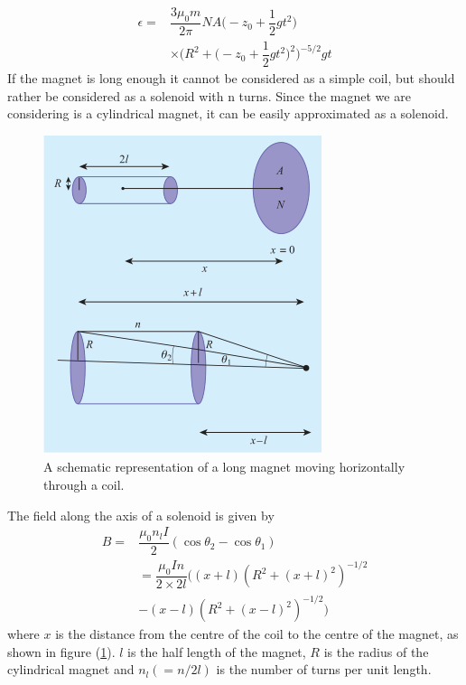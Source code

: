 \documentclass[%
 aip,
 amsmath,amssymb,
 reprint, floatfix%
]{revtex4-1}
\begin{document}
    \begin{equation}
        \begin{split}
            \epsilon = &\dfrac{3 \mu_0 m}{2 \pi} NA \Big( -z_0 + \dfrac{1}{2}gt^2 \Big) \\
            & \times \Bigg(R^2 + \Big( -z_0 + \dfrac{1}{2}gt^2 \Big)^2 \Bigg)^{-5/2} gt
        \end{split}
    \end{equation}
    If the magnet is long enough it cannot be considered as a simple coil, but should rather be considered as a solenoid with n turns. Since the magnet we are considering is a cylindrical magnet, it can be easily approximated as a solenoid.
    \begin{figure}
        \centering
        \includegraphics{Figures/longmagnet.png}
        \caption{A schematic representation of a long magnet moving horizontally through a coil.}
        \label{fig:longmagnet}
    \end{figure}
    The field along the axis of a solenoid is given by
    \begin{equation}
        \begin{split}
            B = &\dfrac{\mu_0 n_l I}{2} (\cos \theta_2 - \cos \theta_1) \\
            & =\dfrac{\mu_0 I n}{2 \times 2l} ((x+l) (R^2 + (x+l)^2)^{-1/2} \\
            & -(x-l)(R^2 + (x-l)^2)^{-1/2})
        \end{split}
    \end{equation}
    where $x$ is the distance from the centre of the coil to the centre of the magnet, as shown in figure (\ref{fig:longmagnet}). $l$ is the half length of the magnet, $R$ is the radius of the cylindrical magnet and $n_l (=n/2l)$ is the number of turns per unit length.
\end{document}
